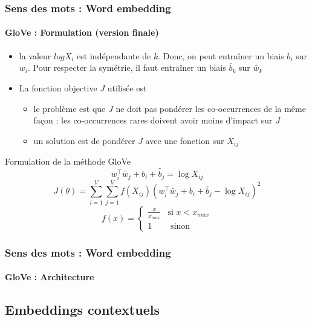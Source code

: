 \documentclass[xcolor=table]{beamer}
\begin{document}
\begin{frame}
\frametitle{Sens des mots : Word embedding}
\framesubtitle{GloVe : Formulation (version finale)}
	
\begin{itemize}
	\item la valeur $log X_i$ est indépendante de $k$. Donc, on peut entraîner un biais $b_i$ sur $w_i$. Pour respecter la symétrie, il faut entraîner un biais $\tilde{b_k}$ sur $\tilde{w_k}$ 
	\item La fonction objective $J$ utilisée est 
	\begin{itemize}
		\item le problème est que $J$ ne doit pas pondérer les co-occurrences de la même façon : les co-occurrences rares doivent avoir moins d'impact sur $J$
		\item un solution est de pondérer $J$ avec une fonction sur $X_{ij}$
	\end{itemize}
\end{itemize}

\vspace{-6pt}
\begin{block}{Formulation de la méthode GloVe}\vspace{-6pt}
	\[w_i^\top \tilde{w_j} + b_i + \tilde{b_j} = \log X_{ij} \]
	\[J(\theta) = \sum_{i=1}^{V} \sum_{j=1}^{V} f(X_{ij}) (w_i^\top \tilde{w_j} + b_i + \tilde{b_j} - \log X_{ij})^2\]
	\vspace{-12pt}\[f(x) = \begin{cases}
	\frac{x}{x_{max}} & \text{si } x < x_{max} \\
	1 & \text{ sinon}
	\end{cases}\]
\vspace{-6pt}\end{block}
	
\end{frame}

\begin{frame}
\frametitle{Sens des mots : Word embedding}
\framesubtitle{GloVe : Architecture}
	
\begin{center}
\end{center}
	
\end{frame}

\subsection{Embeddings contextuels}
\end{document}
